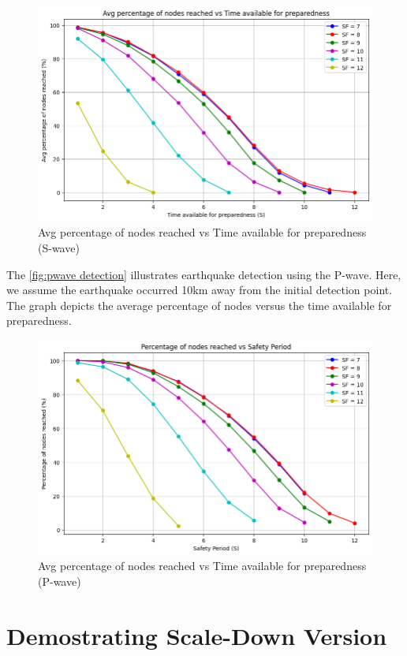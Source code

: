 \newpage

\begin{figure}[ht!]
    \centering
    \includegraphics[width=0.8\linewidth]{images/S-wave detection.png}
    \caption{Avg percentage of nodes reached vs Time available for preparedness (S-wave)}
    \label{fig:swave detection}
\end{figure}

The \autoref{fig:pwave detection} illustrates earthquake detection using the P-wave. Here, we assume the earthquake occurred 10km away from the initial detection point. The graph depicts the average percentage of nodes versus the time available for preparedness.


\begin{figure}[ht!]
    \centering
    \includegraphics[width=0.8\linewidth]{images/p-wave detection.png}
    \caption{Avg percentage of nodes reached vs Time available for preparedness (P-wave)}
    \label{fig:pwave detection}
\end{figure}

\section{Demostrating Scale-Down Version}\label{ch:scale-down}

